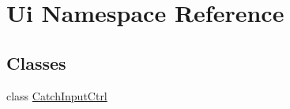 \hypertarget{namespace_ui}{
\section{Ui Namespace Reference}
\label{namespace_ui}
}
\subsection*{Classes}
\begin{DoxyCompactItemize}
\item 
class \hyperlink{class_ui_1_1_catch_input_ctrl}{CatchInputCtrl}
\end{DoxyCompactItemize}
